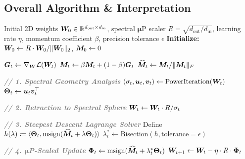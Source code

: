 \subsection{Overall Algorithm \& Interpretation}
\begin{algorithm}[ht]
    \caption{Spectral Sphere Optimizer (SSO)}
    \label{alg:sso}
    \begin{algorithmic}[1]
        \Require
            Initial 2D weights ${\bm{W}}_0 \in \mathbb{R}^{d_{\text{out}} \times d_{\text{in}}}$,
            spectral $\boldsymbol{\mu}$P scaler $R = \sqrt{d_{\text{out}}/d_{\text{in}}}$,
            learning rate $\eta$,
            momentum coefficient $\beta$,
            precision tolerance $\epsilon$
        \State \textbf{Initialize:} ${\bm{W}}_0 \gets R \cdot {\bm{W}}_0 / \|{\bm{W}}_0\|_2$, ${\bm{M}}_0 \gets 0$

            \State ${\bm{G}}_t \gets \nabla_{\bm{W}} \mathcal{L}({\bm{W}}_t)$
            \State ${\bm{M}}_t \gets \beta {\bm{M}}_t + (1-\beta) {\bm{G}}_t$
            \State $\widehat{{\bm{M}}}_t \gets {\bm{M}}_t / \|{\bm{M}}_t\|_F$ \hfill {}

            \Statex \textcolor{gray}{\textbf{\itshape // 1. Spectral Geometry Analysis}}
            \State $({\sigma}_{t}, {\bm{u}}_{t}, {\bm{v}}_{t}) \gets \mathrm{PowerIteration}({\bm{W}}_{t})$ \hfill {}
            \State ${\bm{\Theta}}_t \gets {\bm{u}}_t {\bm{v}}_t^\top$ \hfill {}

            \Statex \textcolor{gray}{\textbf{\itshape // 2. Retraction to Spectral Sphere}}
            \State ${\bm{W}}_t \gets {\bm{W}}_t \cdot R / {\sigma}_{t}$

            \Statex \textcolor{gray}{\textbf{\itshape // 3. Steepest Descent Lagrange Solver}}
            \State Define $h(\lambda) \coloneqq \langle {\bm{\Theta}}_t, \operatorname{msign}(\widehat{{\bm{M}}}_t + \lambda {\bm{\Theta}}_t) \rangle$
            \State $\lambda_t^* \gets \mathrm{Bisection}(h, \text{tolerance}=\epsilon)$ \hfill {}

            \Statex \textcolor{gray}{\textbf{\itshape // 4. $\boldsymbol{\mu}$P-Scaled Update}}
            \State ${\bm{\Phi}}_t \gets \operatorname{msign}(\widehat{{\bm{M}}}_t + \lambda_t^* {\bm{\Theta}}_t)$
            \State ${\bm{W}}_{t+1} \gets {\bm{W}}_t - \eta \cdot R \cdot {\bm{\Phi}}_t$ \hfill {}
        \EndFor
    \end{algorithmic}
\end{algorithm}

